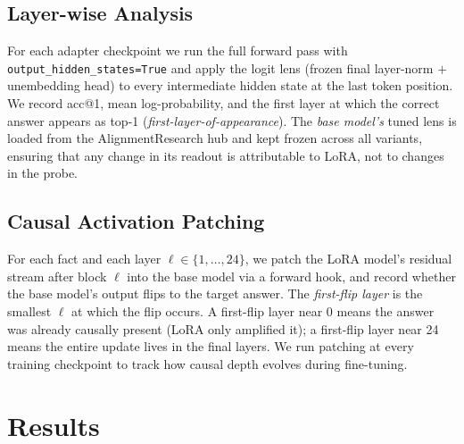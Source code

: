 \documentclass[11pt]{article}
\begin{document}
\subsection{Layer-wise Analysis}
For each adapter checkpoint we run the full forward pass with
\texttt{output\_hidden\_states=True} and apply the logit lens (frozen final
layer-norm $+$ unembedding head) to every intermediate hidden state at the last
token position.
We record acc@1, mean log-probability, and the first layer at which the correct
answer appears as top-1 (\emph{first-layer-of-appearance}).
The \emph{base model's} tuned lens is loaded from the AlignmentResearch hub and
kept frozen across all variants, ensuring that any change in its readout is
attributable to LoRA, not to changes in the probe.

\subsection{Causal Activation Patching}
For each fact and each layer $\ell \in \{1,\ldots,24\}$, we patch the LoRA
model's residual stream after block $\ell$ into the base model via a forward
hook, and record whether the base model's output flips to the target answer.
The \emph{first-flip layer} is the smallest $\ell$ at which the flip occurs.
A first-flip layer near 0 means the answer was already causally present
(LoRA only amplified it); a first-flip layer near 24 means the entire update
lives in the final layers.
We run patching at every training checkpoint to track how causal depth evolves
during fine-tuning.

\section{Results}
\end{document}
